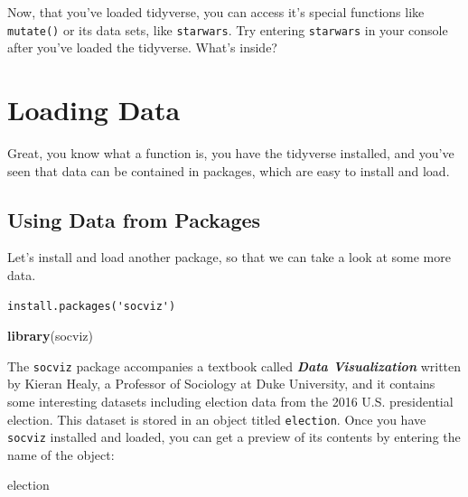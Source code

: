 \documentclass[
]{book}
\newenvironment{Shaded}{\begin{snugshade}}{\end{snugshade}}
\newcommand{\FunctionTok}[1]{\textcolor[rgb]{0.13,0.29,0.53}{\textbf{#1}}}
\newcommand{\NormalTok}[1]{#1}
\begin{document}
Now, that you've loaded tidyverse, you can access it's special functions like \texttt{mutate()} or its data sets, like \texttt{starwars}. Try entering \texttt{starwars} in your console after you've loaded the tidyverse. What's inside?

\hypertarget{loading-data}{%
\section{Loading Data}\label{loading-data}}

Great, you know what a function is, you have the tidyverse installed, and you've seen that data can be contained in packages, which are easy to install and load.

\hypertarget{using-data-from-packages}{%
\subsection{Using Data from Packages}\label{using-data-from-packages}}

Let's install and load another package, so that we can take a look at some more data.

\begin{verbatim}
install.packages('socviz')
\end{verbatim}

\begin{Shaded}
\begin{Highlighting}[]
\FunctionTok{library}\NormalTok{(socviz)}
\end{Highlighting}
\end{Shaded}

The \texttt{socviz} package accompanies a textbook called \textbf{\emph{Data Visualization}} written by Kieran Healy, a Professor of Sociology at Duke University, and it contains some interesting datasets including election data from the 2016 U.S. presidential election. This dataset is stored in an object titled \texttt{election}. Once you have \texttt{socviz} installed and loaded, you can get a preview of its contents by entering the name of the object:

\begin{Shaded}
\begin{Highlighting}[]
\NormalTok{election}
\end{Highlighting}
\end{Shaded}
\end{document}
